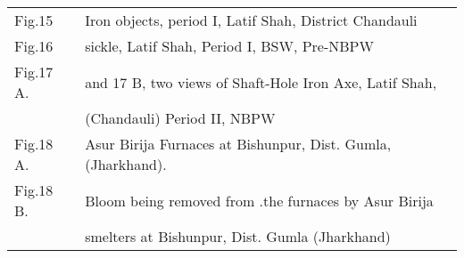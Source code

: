{\begin{longtable}{@{}p{1.3cm}@{}p{8cm}@{}}
Fig.15  & Iron  objects, period I, Latif Shah, District Chandauli \\[2pt]

Fig.16  & sickle, Latif Shah, Period I, BSW, Pre-NBPW \\[2pt]

Fig.17 A. &  and 17 B, two views of Shaft-Hole Iron Axe, Latif Shah,\\[2pt]
          &  (Chandauli) Period II, NBPW\\[2pt]
Fig.18 A.  &  Asur Birija Furnaces at Bishunpur, Dist. Gumla, (Jharkhand). \\[2pt]

Fig.18 B. &  Bloom being removed from .the furnaces by Asur Birija \\ [2pt]
          &  smelters at Bishunpur, Dist. Gumla (Jharkhand)
\end{longtable}}
